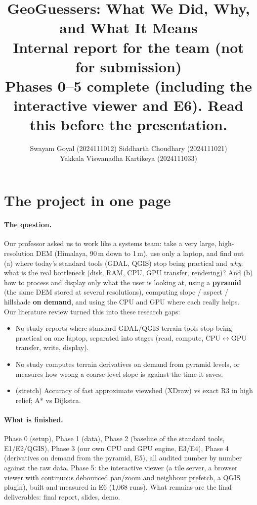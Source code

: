 ﻿\documentclass[11pt,a4paper]{article}
\title{\textbf{GeoGuessers: What We Did, Why, and What It Means}\\[4pt]
\large Internal report for the team (not for submission)\\[2pt]
\normalsize Phases 0--5 complete (including the interactive viewer and E6). Read this before the presentation.}
\author{Swayam Goyal (2024111012) \quad Siddharth Choudhary (2024111021)\\ Yakkala Viswanadha Kartikeya (2024111033)}
\date{}
\begin{document}
\maketitle
\tableofcontents
\newpage

\section{The project in one page}
\paragraph{The question.} Our professor asked us to work like a systems team: take a very large, high-resolution
DEM (Himalaya, 90\,m down to 1\,m), use only a laptop, and find out (a) where today's standard tools (GDAL, QGIS)
stop being practical and \emph{why}: what is the real bottleneck (disk, RAM, CPU, GPU transfer, rendering)? And (b)
how to process and display only what the user is looking at, using a \textbf{pyramid} (the same DEM stored at several
resolutions), computing slope / aspect / hillshade \textbf{on demand}, and using the CPU and GPU where each really
helps. Our literature review turned this into these research gaps:
\begin{itemize}
  \item[\textbf{G1}] No study reports where standard GDAL/QGIS terrain tools stop being practical on one laptop,
  separated into stages (read, compute, CPU$\leftrightarrow$GPU transfer, write, display).
  \item[\textbf{G2}] No study computes terrain derivatives on demand from pyramid levels, or measures how wrong a
  coarse-level slope is against the time it saves.
  \item[\textbf{G3}] (stretch) Accuracy of fast approximate viewshed (XDraw) vs exact R3 in high relief; A* vs Dijkstra.
\end{itemize}

\paragraph{What is finished.} Phase 0 (setup), Phase 1 (data), Phase 2 (baseline of the standard tools, E1/E2/QGIS),
Phase 3 (our own CPU and GPU engine, E3/E4), Phase 4 (derivatives on demand from the pyramid, E5), all audited number
by number against the raw data. Phase 5: the interactive viewer (a tile server, a browser viewer with continuous
debounced pan/zoom and neighbour prefetch, a QGIS plugin), built and measured in E6 (1{,}068 runs). What remains are the
final deliverables: final report, slides, demo.
\end{document}
